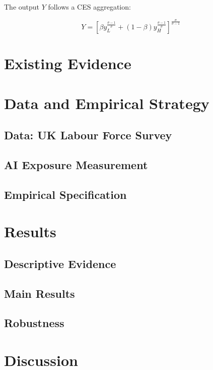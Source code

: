 \documentclass[a4paper, 12pt]{article}
\begin{document}
The output $Y$ follows a CES aggregation: 

$$
Y = [\beta y_L^\frac{\sigma-1}{\sigma} + (1-\beta)y_H^\frac{\sigma-1}{\sigma} ]^\frac{\sigma}{\sigma-1}
$$




\section{Existing Evidence}
\label{sec:literature}



\section{Data and Empirical Strategy}
\label{sec:empirics}

\subsection{Data: UK Labour Force Survey}

\subsection{AI Exposure Measurement}

\subsection{Empirical Specification}

\section{Results}
\label{sec:results}

\subsection{Descriptive Evidence}

\subsection{Main Results}

\subsection{Robustness}

\section{Discussion}
\label{sec:discussion}
\end{document}
